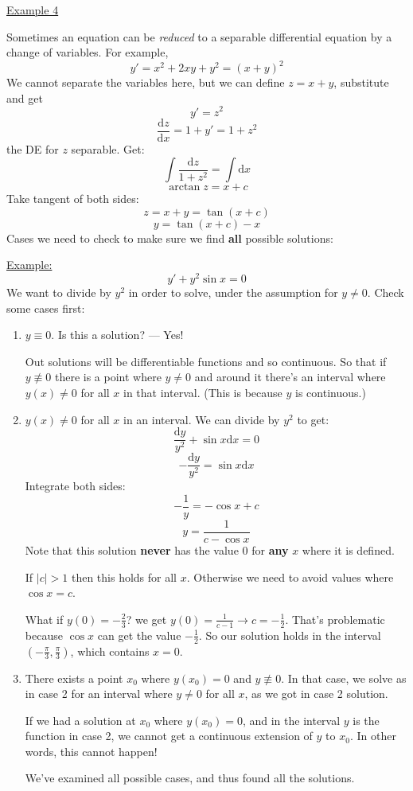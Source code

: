 \documentclass{article}
\newcommand{\mathd}{\mathrm{d}}
\newcommand{\mathpi}{\pi}
\newcommand{\nequiv}{\mathrel{\not\equiv}}
\newcommand{\tmem}[1]{{\em #1\/}}
\newcommand{\tmstrong}[1]{\textbf{#1}}
\newcommand{\tmtextbf}[1]{\text{{\bfseries{#1}}}}
\newenvironment{enumeratenumeric}{\begin{enumerate}[1.] }{\end{enumerate}}
\begin{document}
{\underline{Example 4}}

Sometimes an equation can be {\tmem{reduced}} to a separable differential
equation by a change of variables. For example,
\[ y' = x^2 + 2 xy + y^2 = (x + y)^2 \]
We cannot separate the variables here, but we can define $z = x + y$,
substitute and get
\[ y' = z^2 \]
\[ \frac{\mathd z}{\mathd x} = 1 + y' = 1 + z^2 \]
the DE for $z$ \tmtextbf{is} separable. Get:
\[ \int \frac{\mathd z}{1 + z^2} = \int \mathd x \]
\[ \arctan z = x + c \]
Take tangent of both sides:
\[ z = x + y = \tan (x + c) \]
\[ y = \tan (x + c) - x \]
Cases we need to check to make sure we find {\tmstrong{all}} possible
solutions:

{\underline{Example:}}
\[ y' + y^2 \sin x = 0 \]
We want to divide by $y^2$ in order to solve, under the assumption for $y \neq
0$. Check some cases first:
\begin{enumeratenumeric}
  \item $y \equiv 0$. Is this a solution? --- Yes!
  
  Out solutions will be differentiable functions and so continuous. So that if
  $y \nequiv 0$ there is a point where $y \neq 0$ and around it there's an
  interval where $y (x) \neq 0$ for all $x$ in that interval. (This is because
  $y$ is continuous.)
  
  \item $y (x) \neq 0$ for all $x$ in an interval. We can divide by $y^2$ to
  get:
  \[ \frac{\mathd y}{y^2} + \sin x \mathd x = 0 \]
  \[ - \frac{\mathd y}{y^2} = \sin x \mathd x \]
  Integrate both sides:
  \[ - \frac{1}{y} = - \cos x + c \]
  \[ y = \frac{1}{c - \cos x} \]
  Note that this solution {\tmstrong{never}} has the value 0 for
  {\tmstrong{any}} $x$ where it is defined.
  
  If $| c | > 1$ then this holds for all $x$. Otherwise we need to avoid
  values where $\cos x = c$.
  
  What if $y (0) = - \frac{2}{3}$? we get $y (0) = \frac{1}{c - 1} \rightarrow
  c = - \frac{1}{2}$. That's problematic because $\cos x$ can get the value $-
  \frac{1}{2}$. So our solution holds in the interval $\left( -
  \frac{\mathpi}{3}, \frac{\mathpi}{3} \right)$, which contains $x = 0$.
  
  \item There exists a point $x_0$ where $y (x_0) = 0$ and $y \nequiv 0$. In
  that case, we solve as in case 2 for an interval where $y \neq 0$ for all
  $x$, as we got in case 2 solution.
  
  If we had a solution at $x_0$ where $y (x_0) = 0$, and in the interval $y$
  is the function in case 2, we cannot get a continuous extension of $y$ to
  $x_0$. In other words, this cannot happen!
  
  We've examined all possible cases, and thus found all the solutions.
\end{enumeratenumeric}
\end{document}
